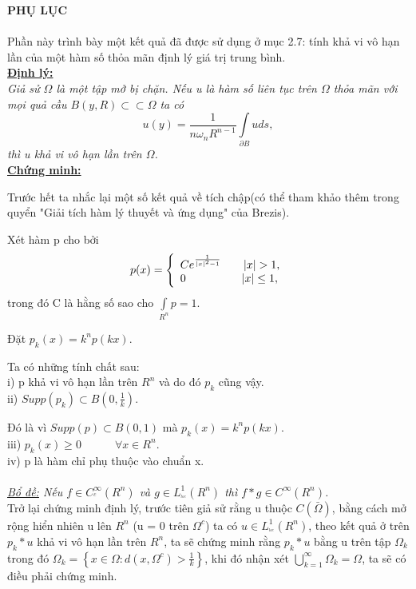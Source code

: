 \textbf{\Large PHỤ LỤC}
\\
\\

Phần này trình bày một kết quả đã được sử dụng ở mục 2.7: tính khả vi vô hạn lần của một hàm số thỏa mãn định lý giá trị trung bình.
\\
\textbf{\underline{Định lý:}}
\\
\textit{Giả sử $\Omega$ là một tập mở bị chặn. Nếu u là hàm số liên tục trên $\Omega$ thỏa mãn với mọi quả cầu $ B(y,R) \subset  \subset \Omega $ 
ta có \[
u(y) = \frac{1}{{n\omega _n R^{n - 1} }}\int\limits_{\partial B} u ds,
\] thì u khả vi vô hạn lần trên $\Omega$. }
\\
\textbf{\underline{Chứng minh:}}

Trước hết ta nhắc lại một số kết quả về tích chập(có thể tham khảo thêm trong quyển "Giải tích hàm lý thuyết và ứng dụng" của Brezis).

Xét hàm p cho bởi 
\begin{equation}
p(x) = \left\{ \begin{array}{l}
 Ce^{\frac{1}{{|x|^2  - 1}}} \quad \quad |x| > 1,\\ 
 {\rm{0}} \quad \quad\quad\quad\quad |x| \le 1,\\ 
 \end{array} \right.
\end{equation}
trong đó C là hằng số sao cho $\int\limits_{R^n } {p = 1} $.

Đặt $p_k (x) = k^n p(kx)$.

Ta có những tính chất sau:
\\
i) p khả vi vô hạn lần trên $R^n$ và do đó $p_k$ cũng vậy.
\\
ii) $Supp(p_k ) \subset B\left( {0,\frac{1}{k}} \right)$.

Đó là vì $Supp(p ) \subset B\left( {0,1} \right)$ mà  $p_k (x) = k^n p(kx)$.
\\
iii) $p_k (x) \ge 0 \quad \quad \quad \forall x \in R^n $.
\\
iv) p là hàm chỉ phụ thuộc vào chuẩn x.
\\
\\
\textit{\underline{Bổ đề:} Nếu $f \in C_{^c }^\infty (R^n )$ và $g \in L_{^{_{loc}} }^1 (R^n )$ 
thì $f*g \in C^\infty(R^n)$.}
\\

Trở lại chứng minh định lý, trước tiên giả sử rằng u thuộc $C(\bar \Omega)$, bằng cách mở rộng hiển nhiên u lên $R^n$ (u = 0 trên $\Omega^c$) ta có $u \in L_{^{_{loc}} }^1 (R^n )$, theo kết quả ở trên $p_k*u$ khả vi vô hạn lần trên $R^n$, ta sẽ chứng minh rằng $p_k*u$ bằng u trên tập $\Omega_k$ trong đó  $\Omega _k  = \left\{ {x \in \Omega :d(x,\Omega^c ) > \frac{1}{k}} \right\}$, khi đó nhận xét $\bigcup\limits_{k = 1}^\infty  {\Omega _k }  = \Omega $, ta sẽ có điều phải chứng minh.

